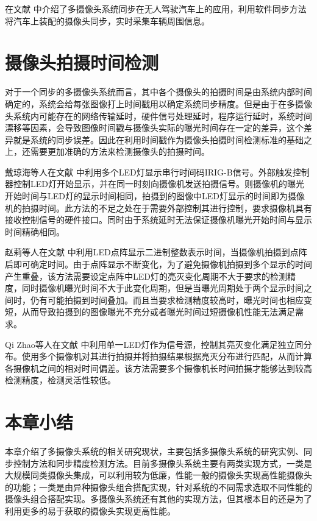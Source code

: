 在文献 \cite{macmillan2015auto, schaffner2016vehicle} 中介绍了多摄像头系统同步在无人驾驶汽车上的应用，利用软件同步方法将汽车上装配的摄像头同步，实时采集车辆周围信息。

\section{摄像头拍摄时间检测}

对于一个同步的多摄像头系统而言，其中各个摄像头的拍摄时间是由系统内部时间确定的，系统会给每张图像打上时间戳用以确定系统同步精度。但是由于在多摄像头系统内可能存在的网络传输延时，硬件信号处理延时，程序运行延时，系统时间漂移等因素，会导致图像时间戳与摄像头实际的曝光时间存在一定的差异，这个差异就是系统的同步误差。因此在利用时间戳作为摄像头拍摄时间检测标准的基础之上，还需要更加准确的方法来检测摄像头的拍摄时间。

戴琼海等人在文献 \cite{戴琼海111} 中利用多个LED灯显示串行时间码IRIG-B信号。外部触发控制器控制LED灯开始显示，并在同一时刻向摄像机发送拍摄信号。则摄像机的曝光开始时间与LED灯的显示时间相同，拍摄到的图像中LED灯显示的时间即为摄像机的拍摄时间。此方法的不足之处在于需要外部控制其进行控制，要求摄像机具有接收控制信号的硬件接口。同时由于系统延时无法保证摄像机曝光开始时间与显示时间精确相同。

赵莉等人在文献 \cite{赵莉1992高速摄影机数据记录系统研究} 中利用LED点阵显示二进制整数表示时间，当摄像机拍摄到点阵后即可确定时间。由于点阵显示不断变化，为了避免摄像机拍摄到多个显示的时间产生重叠，该方法需要设定点阵中LED灯的亮灭变化周期不大于要求的检测精度，同时摄像机曝光时间不大于此变化周期，但是当曝光周期处于两个显示时间之间时，仍有可能拍摄到时间叠加。而且当要求检测精度较高时，曝光时间也相应变短，从而导致拍摄到的图像曝光不充分或者曝光时间过短摄像机性能无法满足需求。

Qi Zhao等人在文献 \cite{zhao2009high} 中利用单一LED灯作为信号源，控制其亮灭变化满足独立同分布。使用多个摄像机对其进行拍摄并将拍摄结果根据亮灭分布进行匹配，从而计算各摄像机之间的相对时间偏差。该方法需要多个摄像机长时间拍摄才能够达到较高检测精度，检测灵活性较低。

\section{本章小结}

本章介绍了多摄像头系统的相关研究现状，主要包括多摄像头系统的研究实例、同步控制方法和同步精度检测方法。目前多摄像头系统主要有两类实现方式，一类是大规模同类摄像头集成，可以利用较为低廉，性能一般的摄像头实现高性能摄像头的功能；一类是由异种摄像头组合搭配实现，针对系统的不同需求选取不同性能的摄像头组合搭配实现。多摄像头系统还有其他的实现方法，但其根本目的还是为了利用更多的易于获取的摄像头实现更高性能。

